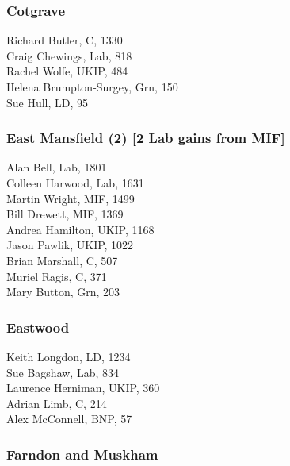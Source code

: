 \documentclass[a4paper,openany,10pt]{book}
\begin{document}
\subsubsection*{Cotgrave}



Richard Butler, C, 1330\\
Craig Chewings, Lab, 818\\
Rachel Wolfe, UKIP, 484\\
{Helena Brumpton-Surgey}, Grn, 150\\
Sue Hull, LD, 95\\


\subsubsection*{East Mansfield (2) \hspace*{\fill}\nolinebreak[1]%
\enspace\hspace*{\fill}
[2 Lab gains from MIF]}



Alan Bell, Lab, 1801\\
Colleen Harwood, Lab, 1631\\
Martin Wright, MIF, 1499\\
Bill Drewett, MIF, 1369\\
Andrea Hamilton, UKIP, 1168\\
Jason Pawlik, UKIP, 1022\\
Brian Marshall, C, 507\\
Muriel Ragis, C, 371\\
Mary Button, Grn, 203\\


\subsubsection*{Eastwood}



Keith Longdon, LD, 1234\\
Sue Bagshaw, Lab, 834\\
Laurence Herniman, UKIP, 360\\
Adrian Limb, C, 214\\
Alex McConnell, BNP, 57\\


\subsubsection*{Farndon and Muskham}
\end{document}
